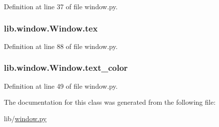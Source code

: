 Definition at line 37 of file window.\+py.

\subsubsection[{\texorpdfstring{tex}{tex}}]{\setlength{\rightskip}{0pt plus 5cm}lib.\+window.\+Window.\+tex}\hypertarget{classlib_1_1window_1_1_window_abab7f0c56567d8300daf6082907b122a}{}\label{classlib_1_1window_1_1_window_abab7f0c56567d8300daf6082907b122a}


Definition at line 88 of file window.\+py.

\subsubsection[{\texorpdfstring{text\+\_\+color}{text_color}}]{\setlength{\rightskip}{0pt plus 5cm}lib.\+window.\+Window.\+text\+\_\+color}\hypertarget{classlib_1_1window_1_1_window_afccc6790aaab20faf9c796f229f6a4b1}{}\label{classlib_1_1window_1_1_window_afccc6790aaab20faf9c796f229f6a4b1}


Definition at line 49 of file window.\+py.



The documentation for this class was generated from the following file\+:\begin{DoxyCompactItemize}
\item 
lib/\hyperlink{window_8py}{window.\+py}\end{DoxyCompactItemize}
